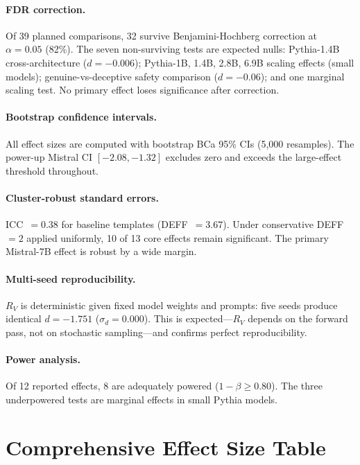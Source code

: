 \documentclass{article}
\newcommand{\RV}{R_V}
\newcommand{\dcohen}{d}
\begin{document}
\paragraph{FDR correction.}
Of 39 planned comparisons, 32 survive Benjamini-Hochberg correction at $\alpha = 0.05$ (82\%).
The seven non-surviving tests are expected nulls: Pythia-1.4B cross-architecture
($\dcohen = -0.006$); Pythia-1B, 1.4B, 2.8B, 6.9B scaling effects (small models);
genuine-vs-deceptive safety comparison ($\dcohen = -0.06$);
and one marginal scaling test.
No primary effect loses significance after correction.

\paragraph{Bootstrap confidence intervals.}
All effect sizes are computed with bootstrap BCa 95\% CIs (5{,}000 resamples).
The power-up Mistral CI $[-2.08, -1.32]$ excludes zero and exceeds the
large-effect threshold throughout.

\paragraph{Cluster-robust standard errors.}
ICC~$= 0.38$ for baseline templates (DEFF~$= 3.67$).
Under conservative DEFF~$= 2$ applied uniformly, 10 of 13 core effects remain significant.
The primary Mistral-7B effect is robust by a wide margin.

\paragraph{Multi-seed reproducibility.}
$\RV$ is deterministic given fixed model weights and prompts: five seeds produce identical
$\dcohen = -1.751$ ($\sigma_d = 0.000$).
This is expected---$\RV$ depends on the forward pass, not on stochastic sampling---and
confirms perfect reproducibility.

\paragraph{Power analysis.}
Of 12 reported effects, 8 are adequately powered ($1 - \beta \geq 0.80$).
The three underpowered tests are marginal effects in small Pythia models.


\section{Comprehensive Effect Size Table}
\label{app:effects}
\end{document}

